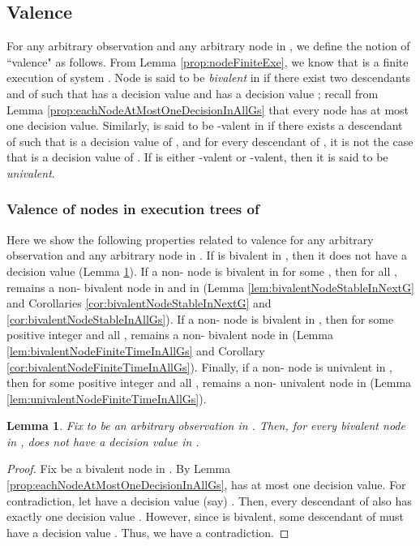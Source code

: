 \documentclass[11pt]{article}
\numberwithin{theorem}{section}
\newtheorem{lemma}[theorem]{Lemma}
\begin{document}
\subsection{Valence}\label{subsec:valence}

For any arbitrary observation  and any arbitrary node  in , we define the notion of ``valence" as follows. From Lemma
\ref{prop:nodeFiniteExe}, we know that  is a finite execution
of system . Node  is said to be \emph{bivalent} in  if
there exist two descendants  and  of  such that
 has a decision value  and  has a decision
value ; recall from Lemma
\ref{prop:eachNodeAtMostOneDecisionInAllGs} that every node has at most one
decision value.  Similarly,  is said to be -valent in  if there exists a descendant
 of  such that  is a decision value of , and for
every descendant  of , it is not the case that  is a
decision value of . If  is either -valent or
-valent, then it is said to be \emph{univalent}.

\subsubsection{Valence of nodes in execution trees of }
Here we show the following properties related to valence for any arbitrary observation  and any arbitrary node  in . If  is bivalent in , then it does not have a decision value (Lemma \ref{prop:bivalentNoDecisionValue}). If a non- node  is bivalent in  for some , then for all ,  remains a non- bivalent node in  and in  (Lemma \ref{lem:bivalentNodeStableInNextG} and Corollaries  \ref{cor:bivalentNodeStableInNextG} and \ref{cor:bivalentNodeStableInAllGs}). If a non- node  is bivalent in , then for some positive integer  and all ,  remains a non- bivalent node in  (Lemma \ref{lem:bivalentNodeFiniteTimeInAllGs} and Corollary \ref{cor:bivalentNodeFiniteTimeInAllGs}). Finally, if a non- node  is univalent in , then for some positive integer  and all ,  remains a non- univalent node in  (Lemma \ref{lem:univalentNodeFiniteTimeInAllGs}).



\begin{lemma}\label{prop:bivalentNoDecisionValue}
 Fix  to be an arbitrary observation in . Then, for every bivalent node  in ,  does not have a decision value in .
\end{lemma}
\begin{proof}
Fix  be a bivalent node in . By Lemma
\ref{prop:eachNodeAtMostOneDecisionInAllGs},  has at most one
decision value. For contradiction, let  have a decision value
(say) . Then, every descendant  of  also has exactly one decision
value . However, since  is bivalent, some descendant  of  must
have a decision value . Thus, we have a contradiction.
\end{proof}
\end{document}
